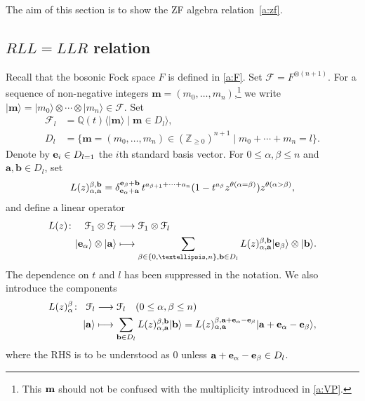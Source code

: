 \documentclass[11pt]{article}
\theoremstyle{definition}
\numberwithin{equation}{section}
\newcommand{\Z}{{\mathbb Z}}
\newcommand{\eb}{\rm{\bf e}}
\newcommand{\F}{\mathcal{F}}
\newcommand{\ot}{\otimes}
\newcommand{\Q}{{\mathbb Q}}
\newcommand{\ket}[1]{\lvert #1 \rangle}
\newcommand{\aaa}{\mathbf{a}}
\newcommand{\bb}{\mathbf{b}}
\newcommand{\mm}{\mathbf{m}}
\begin{document}
The aim of this section is to show the ZF algebra relation~\eqref{a:zf}. 

\subsection{\texorpdfstring{$RLL=LLR$}{RLL=LLR} relation}
Recall that the bosonic Fock space $F$ is defined in \eqref{a:F}.
Set $\F=F^{\ot (n+1)}$. 
For a sequence of non-negative integers $\mm=(m_0,\ldots,m_n)$,\footnote{This ${\bf m}$ should not be confused with 
the multiplicity introduced in \eqref{a:VP}.}
we write $\ket{\mm}=\ket{m_0}\ot\cdots\ot\ket{m_n} \in \F$.
Set 
\begin{align}
\F_l & =\Q(t)\langle\ket{\mm}\mid  \mm \in D_l \rangle,
\\
D_l &= \{\mm = (m_0,\ldots, m_n) \in (\Z_{\ge 0})^{n+1}\mid m_0+\cdots +  m_n = l\}.
\label{a:dl}
\end{align}
Denote by ${\bf e}_i \in D_{l=1}$ the $i$th standard basis vector.
For $0\le\alpha,\beta\le n$
and $\aaa, \bb \in D_l$,  set
\begin{align}
L(z)^{\beta, \bb}_{\alpha, \aaa} = \delta_{ {\bf e}_\alpha +\aaa}^{ {\bf e}_\beta+ \bb}\,
t^{a_{\beta+1}+ \cdots + a_n}(1-t^{a_\beta}z^{\theta(\alpha=\beta)})z^{\theta(\alpha>\beta)},
\label{a:L1}
\end{align}
and define a linear operator 
\begin{equation}\label{a:L}
\begin{aligned}
L(z)\colon \quad  \F_1 \otimes \F_l & \longrightarrow \F_1 \otimes \F_l
\\
\ket{\eb_\alpha} \otimes \ket{\aaa} & \longmapsto
\sum_{\beta\in \{0,\ldots, n\}, \bb \in D_l}L(z)^{\beta, \bb}_{\alpha, \aaa}
\ket{\eb_\beta} \otimes \ket{\bb}.
\end{aligned}
\end{equation}
The dependence on $t$ and $l$ has been suppressed in the notation.
%
We also introduce the components
\begin{equation}\label{a:Lab}
\begin{aligned}
L(z)_\alpha^\beta \colon \;\; \F_l & \longrightarrow  \F_l\quad (0\le \alpha, \beta \le n)
\\
\ket{\aaa} & \longmapsto
\sum_{\bb \in D_l}L(z)^{\beta, \bb}_{\alpha, \aaa}\ket{\bb} = 
L(z)^{\beta, \aaa+\eb_\alpha-\eb_\beta}_{\alpha, \aaa}\ket{\aaa+\eb_\alpha-\eb_\beta},
\end{aligned}
\end{equation}
where the RHS is to be understood as 0 unless $\aaa+{\bf e}_\alpha-{\bf e}_{\beta} \in D_l$.
\end{document}
